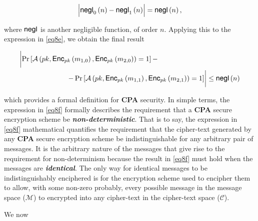 \documentclass[../CryptoFinal.tex]{subfiles}
\begin{document}
\begin{flushleft}
\begin{align*}
  \Bigl| \text{{\fontfamily{phv}\selectfont negl}}_0 \left( n \right) - \text{{\fontfamily{phv}\selectfont negl}}_1 \left( n \right) \Bigr| = \text{{\fontfamily{phv}\selectfont negl}} \left( n \right),
\end{align*}

where $\text{{\fontfamily{phv}\selectfont negl}}$ is another negligible function, of order $n$.  Applying this to the expression in \ref{eq8e}, we obtain the final result

\begin{align}
  &\biggl| \Pr \left[ \mathcal{A} \left( pk,  \text{{\fontfamily{phv}\selectfont Enc}}_{pk} \left( m_{1, 0} \right), \text{{\fontfamily{phv}\selectfont Enc}}_{pk} \left( m_{2, 0} \right) \right) = 1 \right] - \biggr. \notag \\
  &\biggl. \qquad \qquad \qquad \quad - \Pr \left[ \mathcal{A} \left( pk,  \text{{\fontfamily{phv}\selectfont Enc}}_{pk} \left( m_{1, 1} \right), \text{{\fontfamily{phv}\selectfont Enc}}_{pk} \left( m_{2, 1} \right) \right) = 1 \right] \biggr| \leq \text{{\fontfamily{phv}\selectfont negl}} \left( n \right) \label{eq8f}
\end{align}

which provides a formal definition for \textbf{CPA} security.  In simple terms, the expression in \ref{eq8f} formally describes the requirement that a \textbf{CPA} secure encryption scheme be \textbf{\emph{non-deterministic}}. That is to say, the expression in \ref{eq8f} mathematical quantifies the requirement that the cipher-text generated by any \textbf{CPA} secure encryption scheme be indistinguishable for any arbitrary pair of messages.  It is the arbitrary nature of the messages that give rise to the requirement for non-determinism because the result in \ref{eq8f} must hold when the messages are \textbf{\emph{identical}}.  The only way for identical messages to be indistinguishably enciphered is for the encryption scheme used to encipher them to allow, with some non-zero probably, every possible message in the message space ($\mathcal{M}$) to encrypted into any cipher-text in the cipher-text space ($\mathcal{C}$). \newline


\vspace{0.10in}




We now 
























\end{flushleft}
\end{document}
